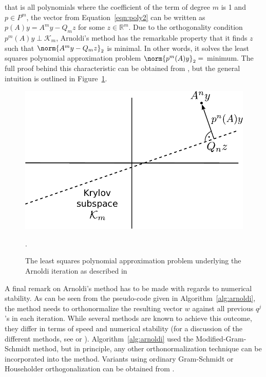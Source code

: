 \noindent that is all polynomials where the coefficient of the term of degree $m$ is 1 and $p \in P^m$, the vector from Equation~\hyperref[eqn:poly2]{\ref{eqn:poly2}} can be written as $p(A)y=A^my-Q_mz$ for some $z \in \mathbb{R}^m$. Due to the orthogonality condition $p^m(A)y \perp \mathcal{K}_m$, Arnoldi's method has the remarkable property that it finds $z$ such that $\norm{A^my-Q_mz}_2$ is minimal. In other words, it solves the least squares polynomial approximation problem $\norm{p^m(A)y}_2 =$ minimum. The full proof behind this characteristic can be obtained from \cite{trefethen_numerical_1997}, but the general intuition is outlined in Figure~\hyperref[fig:arnoldi]{\ref{fig:arnoldi}}.

\begin{figure}[h]
    \centering
    \includegraphics[width=0.6\linewidth]{figures/Arnoldi.pdf}
    \caption{The least squares polynomial approximation problem underlying the Arnoldi iteration as described in \cite{trefethen_numerical_1997}}.
    \label{fig:arnoldi}
\end{figure}

\noindent A final remark on Arnoldi's method has to be made with regards to numerical stability. As can be seen from the pseudo-code given in Algorithm~\hyperref[alg:arnoldi]{\ref{alg:arnoldi}}, the method needs to orthonormalize the resulting vector $w$ against all previous $q^j$'s in each iteration. While several methods are known to achieve this outcome, they differ in terms of speed and numerical stability (for a discussion of the different methods, see \cite{golub} or \cite{trefethen_numerical_1997}). Algorithm~\hyperref[alg:arnoldi]{\ref{alg:arnoldi}} used the Modified-Gram-Schmidt method, but in principle, any other orthonormalization technique can be incorporated into the method. Variants using ordinary Gram-Schmidt or Householder orthogonalization can be obtained from \cite{saad_iterative_2003}.